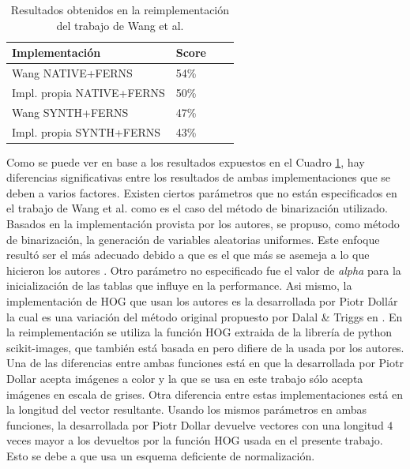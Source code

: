 	\begin{table}
		\centering
	    \begin{tabular}{ | l | l | l | p{5cm} |}
    			\hline
    				\textbf{Implementación} & \textbf{Score} \\ \hline
    				Wang NATIVE+FERNS & 54\% \\ \hline
    				Impl. propia NATIVE+FERNS & 50\% \\ \hline
    				Wang SYNTH+FERNS & 47\% \\ \hline
    				Impl. propia SYNTH+FERNS & 43\% \\

    			\hline
    		\end{tabular}
    		\caption[Resultados reales y sintéticas para baseline]{Resultados obtenidos en la reimplementación del trabajo de Wang et al.}
    		\label{table: Baseline-Table}
	\end{table}

	Como se puede ver en base a los resultados expuestos en el Cuadro \ref{table: Baseline-Table}, hay diferencias significativas entre los resultados de ambas implementaciones que se deben a varios factores. Existen ciertos parámetros que no están especificados en el trabajo de Wang et al. como es el caso del método de binarización utilizado. Basados en la implementación provista por los autores, se propuso, como método de binarización, la generación de variables aleatorias uniformes. Este enfoque resultó ser el más adecuado debido a que es el que más se asemeja a lo que hicieron los autores \cite{wang}. Otro parámetro no especificado fue el valor de \textit{alpha} para la inicialización de las tablas que influye en la performance. Asi mismo, la implementación de HOG que usan los autores es la desarrollada por Piotr Dollár \cite{PiotrD} la cual es una variación del método original propuesto por Dalal \& Triggs en \cite{DT05}. En la reimplementación se utiliza la función HOG extraida de la librería de python scikit-images, que también está basada en \cite{DT05} pero difiere de la usada por los autores. Una de las diferencias entre ambas funciones está en que la desarrollada por Piotr Dollar acepta imágenes a color y la que se usa en este trabajo sólo acepta imágenes en escala de grises. Otra diferencia entre estas implementaciones está en la longitud del vector resultante. Usando los mismos parámetros en ambas funciones, la desarrollada por Piotr Dollar devuelve vectores con una longitud $4$ veces mayor a los devueltos por la función HOG usada en el presente trabajo. Esto se debe a que usa un esquema deficiente de normalización.

